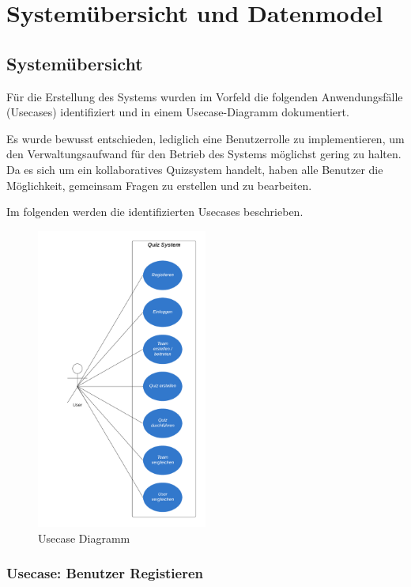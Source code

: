 \section{Systemübersicht und Datenmodel}

\subsection{Systemübersicht}

Für die Erstellung des Systems wurden im Vorfeld die folgenden Anwendungsfälle (Usecases) 
identifiziert und in einem Usecase-Diagramm dokumentiert.\newline


\noindent Es wurde bewusst entschieden, lediglich eine Benutzerrolle zu implementieren, um den 
Verwaltungsaufwand für den Betrieb des Systems möglichst gering zu halten. Da es sich um ein 
kollaboratives Quizsystem handelt, haben alle Benutzer die Möglichkeit, gemeinsam Fragen zu 
erstellen und zu bearbeiten.\newline

\noindent Im folgenden werden die identifizierten Usecases beschrieben.

\begin{figure}[H]
  \centering
  \includegraphics[width=0.5\textwidth]{img/Quiz System - Use Case Diagramm.png}
  \caption{Usecase Diagramm}
\end{figure}

\subsubsection{Usecase: Benutzer Registieren}

